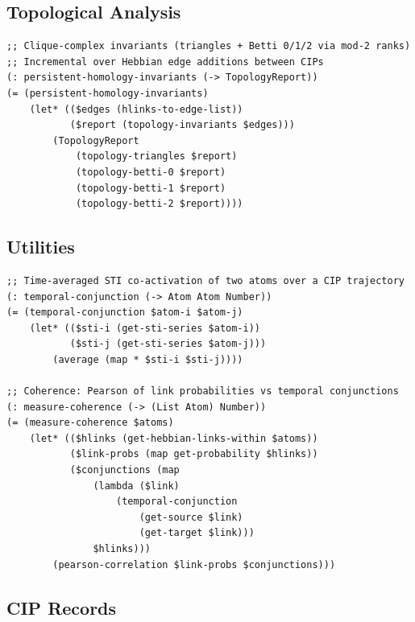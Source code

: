 \documentclass[11pt]{article}
\theoremstyle{definition}
\begin{document}
\subsection{Topological Analysis}

\begin{lstlisting}[style=metta, caption=Persistent Homology]
;; Clique-complex invariants (triangles + Betti 0/1/2 via mod-2 ranks)
;; Incremental over Hebbian edge additions between CIPs
(: persistent-homology-invariants (-> TopologyReport))
(= (persistent-homology-invariants)
    (let* (($edges (hlinks-to-edge-list))
           ($report (topology-invariants $edges)))
        (TopologyReport
            (topology-triangles $report)
            (topology-betti-0 $report)
            (topology-betti-1 $report)
            (topology-betti-2 $report))))
\end{lstlisting}

\subsection{Utilities}

\begin{lstlisting}[style=metta, caption=Coherence helpers]
;; Time-averaged STI co-activation of two atoms over a CIP trajectory
(: temporal-conjunction (-> Atom Atom Number))
(= (temporal-conjunction $atom-i $atom-j)
    (let* (($sti-i (get-sti-series $atom-i))
           ($sti-j (get-sti-series $atom-j)))
        (average (map * $sti-i $sti-j))))

;; Coherence: Pearson of link probabilities vs temporal conjunctions
(: measure-coherence (-> (List Atom) Number))
(= (measure-coherence $atoms)
    (let* (($hlinks (get-hebbian-links-within $atoms))
           ($link-probs (map get-probability $hlinks))
           ($conjunctions (map
               (lambda ($link)
                   (temporal-conjunction
                       (get-source $link)
                       (get-target $link)))
               $hlinks)))
        (pearson-correlation $link-probs $conjunctions)))
\end{lstlisting}

\subsection{CIP Records}
\end{document}
